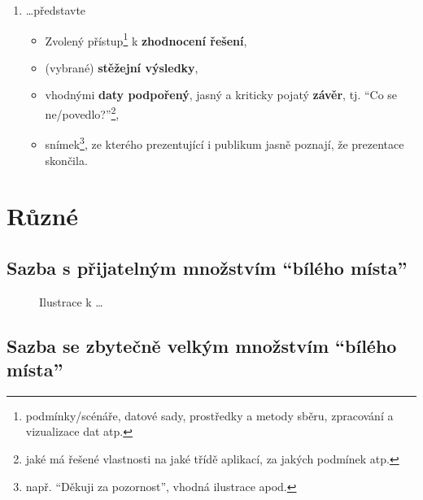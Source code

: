\documentclass[a4paper,11pt, twoside]{report}
\begin{document}
\begin{enumerate}
\begin{description}
\begin{enumerate}
\item[]
\ldots představte
\begin{itemize}
\item
Zvolený přístup\footnote{podmínky/scénáře, datové sady, prostředky a metody sběru, zpracování a vizualizace dat atp.} k  \textbf{zhodnocení řešení}, 
\item
(vybrané) \textbf{stěžejní výsledky},
\item
vhodnými \textbf{daty podpořený}, jasný a kriticky pojatý \textbf{závěr}, tj. ``Co se ne/povedlo?''\footnote{jaké má řešené vlastnosti na jaké třídě aplikací, za jakých podmínek atp.},
\item
snímek\footnote{např. ``Děkuji za pozornost'', vhodná ilustrace apod.}, ze kterého prezentující i publikum jasně poznají, že prezentace skončila.
\end{itemize}
\end{enumerate}
  
\end{description}

\end{enumerate}

\raggedbottom

\quad


\chapter{Různé}


\thispagestyle{fancy}

\vspace{-8mm}

\section{Sazba s přijatelným množstvím ``bílého místa''}
\label{sec:C-1}

\vspace{-2mm}


\begin{figure}[h]
  \begin{floatrow}
     \ffigbox[2.0\FBwidth]
    {
\scalebox{5.0}{
	\faLineChart
}
    }
    {\caption{Ilustrace k \ldots}
    \label{fig:C-1}
  }
  \end{floatrow}
\end{figure}


\section{Sazba se zbytečně velkým množstvím ``bílého místa''}
\label{sec:C-2}
\vspace{-2mm}
\end{document}
